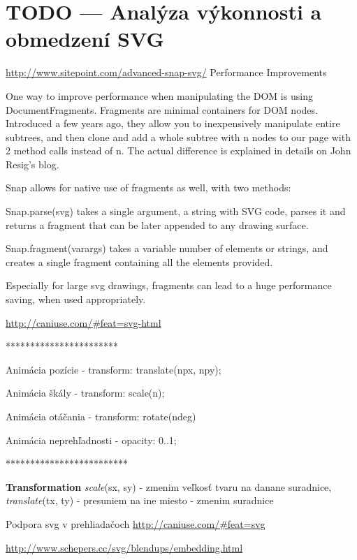 \chapter{TODO --- Analýza výkonnosti a obmedzení SVG}

\url{http://www.sitepoint.com/advanced-snap-svg/}
Performance Improvements

One way to improve performance when manipulating the DOM is using DocumentFragments. Fragments are minimal containers for DOM nodes. Introduced a few years ago, they allow you to inexpensively manipulate entire subtrees, and then clone and add a whole subtree with n nodes to our page with 2 method calls instead of n. The actual difference is explained in details on John Resig’s blog.

Snap allows for native use of fragments as well, with two methods:

Snap.parse(svg) takes a single argument, a string with SVG code, parses it and returns a fragment that can be later appended to any drawing surface.

Snap.fragment(varargs) takes a variable number of elements or strings, and creates a single fragment containing all the elements provided.

Especially for large svg drawings, fragments can lead to a huge performance saving, when used appropriately.


\newpage


\url{http://caniuse.com/#feat=svg-html}


***********************

Animácia pozície 
- transform: translate(npx, npy);

Animácia škály 
- transform: scale(n);

Animácia otáčania
- transform: rotate(ndeg)

Animácia neprehľadnosti 
- opacity: 0..1;

*************************



\textbf{Transformation}
\textit{scale}(sx, sy) - zmenim veľkosť tvaru na danane suradnice, 
\textit{translate}(tx, ty) - presuniem na ine miesto - zmenim suradnice 


Podpora svg v prehliadačoch
\url{http://caniuse.com/#feat=svg}

\url{http://www.schepers.cc/svg/blendups/embedding.html}